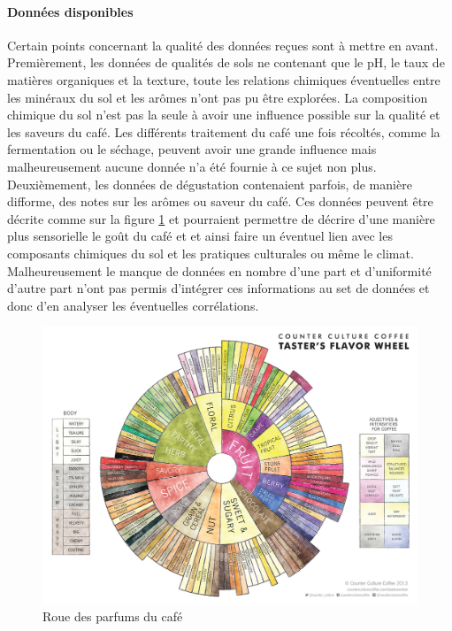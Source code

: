 \paragraph{Données disponibles} Certain points concernant la qualité des données reçues sont à mettre en avant. Premièrement, les données de qualités de sols ne contenant que le pH, le taux de matières organiques et la texture, toute les relations chimiques éventuelles entre les minéraux du sol et les arômes n'ont pas pu être explorées. La composition chimique du sol n'est pas la seule à avoir une influence possible sur la qualité et les saveurs du café. Les différents traitement du café une fois récoltés, comme la fermentation ou le séchage, peuvent avoir une grande influence mais malheureusement aucune donnée n'a été fournie à ce sujet non plus. \\

\noindent Deuxièmement, les données de dégustation contenaient parfois, de manière difforme, des notes sur les arômes ou saveur du café. Ces données peuvent être décrite comme sur la figure \ref{fig:coffeeflavorwheel} et pourraient permettre de décrire d'une manière plus sensorielle le goût du café et et ainsi faire un éventuel lien avec les composants chimiques du sol et les pratiques culturales ou même le climat. Malheureusement le manque de données en nombre d'une part et d'uniformité d'autre part n'ont pas permis d'intégrer ces informations au set de données et donc d'en analyser les éventuelles corrélations.\\

\begin{figure}[h]
	\centering
	\includegraphics[width=1\linewidth]{img/coffee_flavor_wheel}
	\caption{Roue des parfums du café}
	\label{fig:coffeeflavorwheel}
\end{figure}



